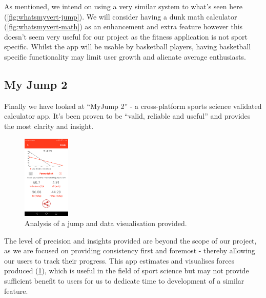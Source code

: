 As mentioned, we intend on using a very similar system to what's seen here (\cref{fig:whatsmyvert-jump}).
We will consider having a dunk math calculator (\cref{fig:whatsmyvert-math}) as an enhancement and extra feature however this doesn't seem
very useful for our project as the fitness application is not sport specific. Whilst the app will be usable
by basketball players, having basketball specific functionality may limit user growth and alienate
average enthusiasts.

\subsection{My Jump 2}
\label{research:my-jump}
Finally we have looked at ``MyJump 2'' - a cross-platform sports science validated calculator app.
It's been proven to be ``valid, reliable and useful'' \cite{myjump-proof} and provides
the most clarity and insight.
\begin{figure}[H]
	\centering
	\includegraphics[width=0.2\textwidth]{graphics/myjump2/jump-forces.png}
	\caption{Analysis of a jump and data visualisation provided.}
	\label{fig:myjump2-analysis}	
\end{figure}
The level of precision and insights provided are beyond the scope of our project, as we are focused
on providing consistency first and foremost - thereby allowing our users to track their progress.
This app estimates and visualises forces produced (\cref{fig:myjump2-analysis}), which is useful
in the field of sport science but may not provide sufficient benefit to users for us to dedicate
time to development of a similar feature.
